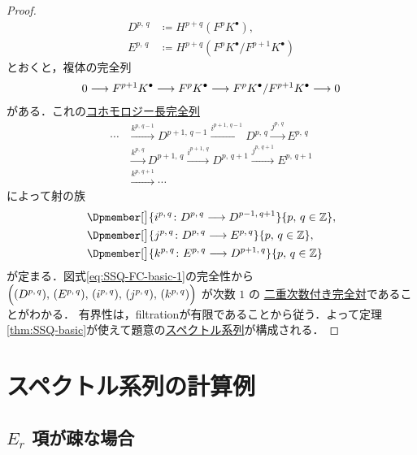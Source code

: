 \documentclass[algtopo_main]{subfiles}
\begin{document}
\begin{proof}
    \begin{align}
        D^{p,\, q} &\coloneqq H^{p+q}(F^p K^\bullet), \\
        E^{p,\, q} &\coloneqq H^{p+q}(F^p K^\bullet/ F^{p+1} K^\bullet)
    \end{align}
    とおくと，複体の完全列
    \begin{align}
        0 \longrightarrow F^{p+1} K^\bullet \longrightarrow F^p K^\bullet \longrightarrow F^p K^\bullet / F^{p+1} K^\bullet \longrightarrow 0
    \end{align}
    がある．これの\hyperref[prop:LES-cohomology]{コホモロジー長完全列}
    \begin{align}
        \cdots &\xrightarrow{k^{p,\, q-1}} D^{p+1,\, q-1} \xrightarrow{i^{p+1,\, q-1}} D^{p,\, q} \xrightarrow{j^{p,\, q}} E^{p,\, q} \\
        &\xrightarrow{k^{p,\, q}} D^{p+1,\, q} \xrightarrow{i^{p+1,\, q}} D^{p,\, q+1} \xrightarrow{j^{p,\, q+1}} E^{p,\, q+1} \\
        &\xrightarrow{k^{p,\, q+1}} \cdots \label{eq:SSQ-FC-basic-1}
    \end{align}
    によって射の族
    \begin{align}
        &\Dpmember[\big]{i^{p,\, q} \colon D^{p,\, q} \lto D^{p-1,\, q+1}}{p,\, q \in \mathbb{Z}},\\ 
        &\Dpmember[\big]{j^{p,\, q} \colon D^{p,\, q} \lto E^{p,\, q}}{p,\, q \in \mathbb{Z}}, \\
        &\Dpmember[\big]{k^{p,\, q} \colon E^{p,\, q} \lto D^{p+1,\, q}}{p,\, q \in \mathbb{Z}}
    \end{align}
    が定まる．図式\eqref{eq:SSQ-FC-basic-1}の完全性から $\Bigl( (D^{p,\, q}),\, (E^{p,\, q}),\, (i^{p,\, q}),\, (j^{p,\, q}),\, (k^{p,\, q}) \Bigr)$ が次数 $1$ の \hyperref[def:BEC]{二重次数付き完全対}であることがわかる．
    有界性は，filtrationが有限であることから従う．よって定理\ref{thm:SSQ-basic}が使えて題意の\hyperref[def:SSQ]{スペクトル系列}が構成される．
\end{proof}

\section{スペクトル系列の計算例}

\subsection{$E_r$ 項が疎な場合}
\end{document}
